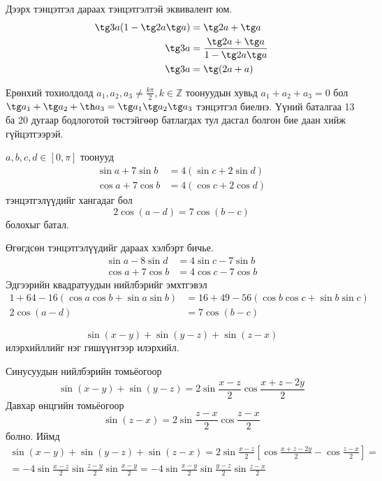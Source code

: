 \documentclass[10pt,a4paper,oneside]{book}
\begin{document}
\TheSolution
Дээрх тэнцэтгэл дараах тэнцэтгэлтэй эквивалент юм.
\begin{align*}
\tg 3a(1-\tg 2a \tg a) &= \tg 2a + \tg a\\
\tg 3a &= \frac{\tg 2a + \tg a}{1-\tg 2a\tg a}\\
\tg 3a &= \tg(2a + a)
\end{align*}

\Note
Ерөнхий тохиолдолд $a_1, a_2, a_3 \neq \frac{k\pi}{2}, k \in \mathbb{Z}$ тоонуудын хувьд $a_1+a_2+a_3=0$ бол $\tg a_1 + \tg a_2 + \th a_3 = \tg a_1\tg a_2\tg a_3$ тэнцэтгэл биелнэ. Үүний баталгаа 13 ба 20 дугаар бодлоготой төстэйгөөр батлагдах тул дасгал болгон бие даан хийж гүйцэтгээрэй.

\Problem
$a, b, c, d \in [0, \pi]$ тоонууд
\begin{align*}
\sin a + 7\sin b &= 4\left(\sin c + 2\sin d\right)\\
\cos a + 7\cos b &= 4\left(\cos c + 2\cos d\right)
\end{align*}
тэнцэтгэлүүдийг хангадаг бол
\begin{equation*}
2\cos(a-d) = 7\cos(b-c)
\end{equation*}
болохыг батал.

\TheSolution
Өгөгдсөн тэнцэтгэлүүдийг дараах хэлбэрт бичье.
\begin{align*}
\sin a - 8\sin d &=4\sin c - 7\sin b\\
\cos a + 7\cos b &=4\cos c - 7\cos b
\end{align*}
Эдгээрийн квадратуудын нийлбэрийг эмхтгэвэл
\begin{align*}
1+64-16\left(\cos a\cos b + \sin a\sin b\right) &= 16 + 49 - 56\left(\cos b\cos c + \sin b\sin c\right)\\
2\cos(a-d) &= 7\cos(b-c)
\end{align*}

\Problem
\begin{equation*}
\sin(x-y)+\sin(y-z)+\sin(z-x)
\end{equation*}
илэрхийллийг нэг гишүүнтээр илэрхийл.

\TheSolution
Синусуудын нийлбэрийн томьёогоор
\begin{equation*}
\sin(x-y)+\sin(y-z) = 2\sin\frac{x-z}{2}\cos\frac{x+z-2y}{2}
\end{equation*}
Давхар өнцгийн томьёогоор
\begin{equation*}
\sin(z-x) = 2\sin\frac{z-x}{2}\cos\frac{z-x}{2}
\end{equation*}
болно. Иймд
\begin{multline*}
\sin(x-y)+\sin(y-z)+\sin(z-x)
= 2\sin\frac{x-z}{2}\left[\cos\frac{x+z-2y}{2}-\cos\frac{z-x}{2}\right] = \\
= -4\sin\frac{x-z}{2}\sin\frac{z-y}{2}\sin\frac{x-y}{2}
= -4\sin\frac{x-y}{2}\sin\frac{y-z}{2}\sin\frac{z-x}{2}
\end{multline*}
\end{document}
